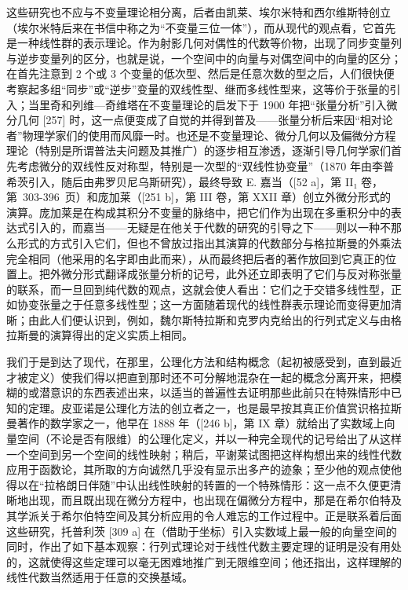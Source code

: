 这些研究也不应与不变量理论相分离，后者由凯莱、埃尔米特和西尔维斯特创立（埃尔米特后来在书信中称之为“不变量三位一体”），而从现代的观点看，它首先是一种线性群的表示理论。作为射影几何对偶性的代数等价物，出现了同步变量列与逆步变量列的区分，也就是说，一个空间中的向量与对偶空间中的向量的区分；在首先注意到 2 个或 3 个变量的低次型、然后是任意次数的型之后，人们很快便考察起多组“同步”或“逆步”变量的双线性型、继而多线性型来，这等价于张量的引入；当里奇和列维—奇维塔在不变量理论的启发下于 1900 年把“张量分析”引入微分几何 {[}257{]} 时，这一点便变成了自觉的并得到普及——张量分析后来因“相对论者”物理学家们的使用而风靡一时。也还是不变量理论、微分几何以及偏微分方程理论（特别是所谓普法夫问题及其推广）的逐步相互渗透，逐渐引导几何学家们首先考虑微分的双线性反对称型，特别是一次型的“双线性协变量”（1870 年由李普希茨引入，随后由弗罗贝尼乌斯研究），最终导致 E. 嘉当（{[}52 a{]}，第 II₁ 卷，第~303-396~页）和庞加莱（{[}251 b{]}，第 III 卷，第 XXII 章）创立外微分形式的演算。庞加莱是在构成其积分不变量的脉络中，把它们作为出现在多重积分中的表达式引入的，而嘉当——无疑是在他关于代数的研究的引导之下——则以一种不那么形式的方式引入它们，但也不曾放过指出其演算的代数部分与格拉斯曼的外乘法完全相同（他采用的名字即由此而来），从而最终把后者的著作放回到它真正的位置上。把外微分形式翻译成张量分析的记号，此外还立即表明了它们与反对称张量的联系，而一旦回到纯代数的观点，这就会使人看出：它们之于交错多线性型，正如协变张量之于任意多线性型；这一方面随着现代的线性群表示理论而变得更加清晰；由此人们便认识到，例如，魏尔斯特拉斯和克罗内克给出的行列式定义与由格拉斯曼的演算得出的定义实质上相同。

我们于是到达了现代，在那里，公理化方法和结构概念（起初被感受到，直到最近才被定义）使我们得以把直到那时还不可分解地混杂在一起的概念分离开来，把模糊的或潜意识的东西表述出来，以适当的普遍性去证明那些此前只在特殊情形中已知的定理。皮亚诺是公理化方法的创立者之一，也是最早按其真正价值赏识格拉斯曼著作的数学家之一，他早在 1888 年（{[}246 b{]}，第 IX 章）就给出了实数域上向量空间（不论是否有限维）的公理化定义，并以一种完全现代的记号给出了从这样一个空间到另一个空间的线性映射；稍后，平谢莱试图把这样构想出来的线性代数应用于函数论，其所取的方向诚然几乎没有显示出多产的迹象；至少他的观点使他得以在“拉格朗日伴随”中认出线性映射的转置的一个特殊情形：这一点不久便更清晰地出现，而且既出现在微分方程中，也出现在偏微分方程中，那是在希尔伯特及其学派关于希尔伯特空间及其分析应用的令人难忘的工作过程中。正是联系着后面这些研究，托普利茨 {[}309 a{]} 在（借助于坐标）引入实数域上最一般的向量空间的同时，作出了如下基本观察：行列式理论对于线性代数主要定理的证明是没有用处的，这就使得这些定理可以毫无困难地推广到无限维空间；他还指出，这样理解的线性代数当然适用于任意的交换基域。

